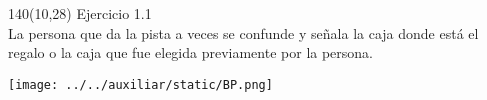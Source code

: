 \documentclass[shownotes,aspectratio=169]{beamer}
\begin{document}
\begin{frame}[plain]


\begin{textblock}{140}(10,28)
\Large Ejercicio 1.1 \\[0.4cm]

\large La persona que da la pista a veces se confunde y señala la caja donde está el regalo o la caja que fue elegida previamente por la persona. \\[0.2cm]


\end{textblock}


\end{frame}

\begin{frame}
\centering \vspace{0.5cm}
\texttt{[image: ../../auxiliar/static/BP.png]}
\end{frame}





%
%
\end{document}
